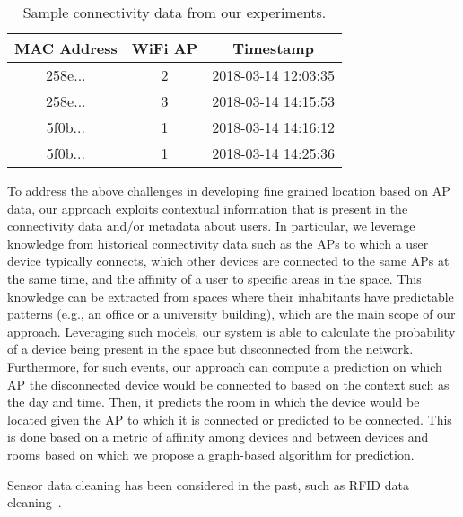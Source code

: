 \begin{table}[!htb]
	\centering
	\caption{Sample connectivity data from our experiments.}
	\label{tab:connectivity}
	\label{tab:wifi}
	\begin{tabular}{|c|c|c|}
		\hline
		MAC Address & WiFi AP & Timestamp \\ \hline
		258e... & 2 & 2018-03-14 12:03:35  \\ \hline
		258e... & 3 & 2018-03-14 14:15:53 \\ \hline
		5f0b... & 1 & 2018-03-14 14:16:12 \\ \hline
		5f0b... & 1 & 2018-03-14 14:25:36 \\ \hline
	\end{tabular}
	\vspace{-0.5em}
\end{table} 

To address the above challenges in developing fine grained location based on AP data, our approach exploits contextual information that is present in the connectivity data and/or metadata about users. In particular, we leverage knowledge from historical connectivity data such as the APs to which a user device typically connects, which other devices are connected to the same APs at the same time, and the affinity of a user to specific areas in the space. This knowledge can be extracted from spaces where their inhabitants have predictable patterns (e.g., an office or a university building), which are the main scope of our approach. Leveraging such models, our system is able to calculate the probability of a device being present in the space but disconnected from the network. Furthermore, for such events, our approach can compute a prediction on which AP the disconnected device would be connected to based on the context such as the day and time. Then, it predicts the room in which the device would be located given the AP to which it is connected or predicted to be connected. This is done based on a metric of affinity among devices and between devices and rooms based on which we propose a graph-based algorithm for prediction. 

Sensor data cleaning has been considered in the past, such as RFID data cleaning~\cite{jeffery2006adaptive,baba2016learning}. 




